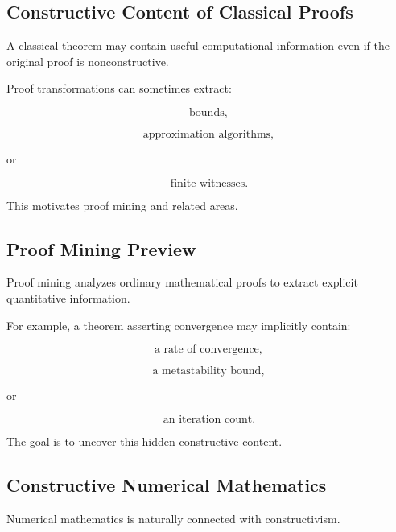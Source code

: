 \subsection{Constructive Content of Classical Proofs}
\label{subsec:constructive-content-classical-proofs}

A classical theorem may contain useful computational information even if the
original proof is nonconstructive.

Proof transformations can sometimes extract:

\[
\boxed{
\text{bounds},
}
\]

\[
\boxed{
\text{approximation algorithms},
}
\]

or

\[
\boxed{
\text{finite witnesses}.
}
\]

This motivates proof mining and related areas.

\subsection{Proof Mining Preview}
\label{subsec:proof-mining-preview}

Proof mining analyzes ordinary mathematical proofs to extract explicit
quantitative information.

For example, a theorem asserting convergence may implicitly contain:

\[
\boxed{
\text{a rate of convergence},
}
\]

\[
\boxed{
\text{a metastability bound},
}
\]

or

\[
\boxed{
\text{an iteration count}.
}
\]

The goal is to uncover this hidden constructive content.

\subsection{Constructive Numerical Mathematics}
\label{subsec:constructive-numerical-mathematics}

Numerical mathematics is naturally connected with constructivism.

